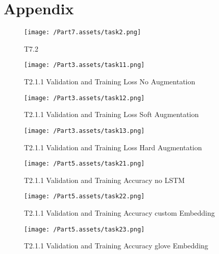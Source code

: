 \documentclass[10pt,twocolumn,letterpaper]{article}
\begin{document}
\clearpage

{\small
    
    
}

\section{Appendix}

\begin{figure}[ht]
    \begin{center}
        \texttt{[image: /Part7.assets/task2.png]}
        \caption{T7.2 }\label{fig:t72}
    \end{center}
\end{figure}

\begin{figure}[ht]
    \begin{center}
        \texttt{[image: /Part3.assets/task11.png]}
        \caption{T2.1.1 Validation and Training Loss No Augmentation}\label{fig:t311}
    \end{center}
\end{figure}
\begin{figure}[ht]
    \begin{center}
        \texttt{[image: /Part3.assets/task12.png]}
        \caption{T2.1.1 Validation and Training Loss Soft Augmentation}\label{fig:t312}
    \end{center}
\end{figure}
\begin{figure}[ht]
    \begin{center}
        \texttt{[image: /Part3.assets/task13.png]}
        \caption{T2.1.1 Validation and Training Loss Hard Augmentation}\label{fig:t313}
    \end{center}
\end{figure}

\begin{figure}[ht]
    \begin{center}
        \texttt{[image: /Part5.assets/task21.png]}
        \caption{T2.1.1 Validation and Training Accuracy no LSTM}\label{fig:t521}
    \end{center}
\end{figure}
\begin{figure}[ht]
    \begin{center}
        \texttt{[image: /Part5.assets/task22.png]}
        \caption{T2.1.1 Validation and Training Accuracy custom Embedding}\label{fig:t522}
    \end{center}
\end{figure}
\begin{figure}[ht]
    \begin{center}
        \texttt{[image: /Part5.assets/task23.png]}
        \caption{T2.1.1 Validation and Training Accuracy glove Embedding}\label{fig:t523}
    \end{center}
\end{figure}
\end{document}
